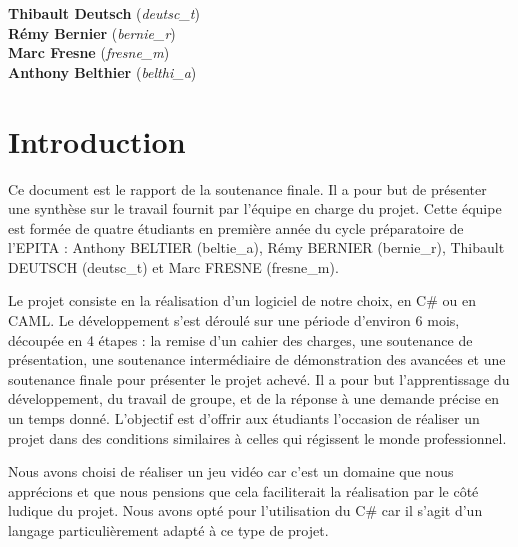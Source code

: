\documentclass[11pt]{report}
\begin{document}
\begin{titlepage}
\Large
\textbf{Thibault Deutsch} (\emph{deutsc\_t}) \\
\textbf{Rémy Bernier} (\emph{bernie\_r}) \\
\textbf{Marc Fresne} (\emph{fresne\_m}) \\
\textbf{Anthony Belthier} (\emph{belthi\_a})\\[2cm]

\vfill %

\end{titlepage}

\newpage
{}

\chapter*{Introduction}

Ce document est le rapport de la soutenance finale. Il a pour but de présenter une synthèse sur le travail fournit par l'équipe en charge du projet. Cette équipe est formée de quatre étudiants en première année du cycle préparatoire de l'EPITA : Anthony BELTIER (beltie\_a), Rémy BERNIER (bernie\_r), Thibault DEUTSCH (deutsc\_t) et Marc FRESNE (fresne\_m).

Le projet consiste en la réalisation d'un logiciel de notre choix, en C\# ou en CAML. Le développement s'est déroulé sur une période d'environ 6 mois, découpée en 4 étapes : la remise d'un cahier des charges, une soutenance de présentation, une soutenance intermédiaire de démonstration des avancées et une soutenance finale pour présenter le projet achevé. Il a pour but l'apprentissage du développement, du travail de groupe, et de la réponse à une demande précise en un temps donné. L'objectif est d'offrir aux étudiants l'occasion de réaliser un projet dans des conditions similaires à celles qui régissent le monde professionnel.

Nous avons choisi de réaliser un jeu vidéo car c'est un domaine que nous apprécions et que nous pensions que cela faciliterait la réalisation par le côté ludique du projet. Nous avons opté pour l’utilisation du C\# car il s’agit d’un langage particulièrement adapté à ce type de projet. 
\end{document}
